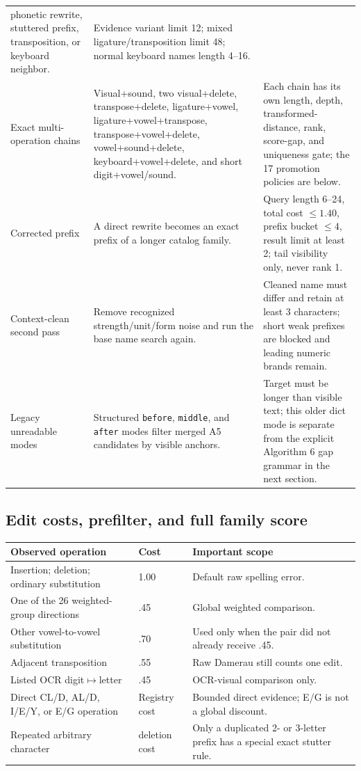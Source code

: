 \documentclass[10pt,a4paper]{article}
\begin{document}
\begin{longtable}{@{}L{34mm}L{68mm}L{64mm}@{}}
phonetic rewrite, stuttered prefix, transposition, or keyboard neighbor. &
Evidence variant limit 12; mixed ligature/transposition limit 48; normal
keyboard names length 4--16. \\
Exact multi-operation chains & Visual+sound, two visual+delete,
transpose+delete, ligature+vowel, ligature+vowel+transpose,
transpose+vowel+delete, vowel+sound+delete, keyboard+vowel+delete, and short
digit+vowel/sound. & Each chain has its own length, depth, transformed-distance,
rank, score-gap, and uniqueness gate; the 17 promotion policies are below. \\
Corrected prefix & A direct rewrite becomes an exact prefix of a longer
catalog family. & Query length 6--24, total cost $\leq1.40$, prefix bucket
$\leq4$, result limit at least 2; tail visibility only, never rank 1. \\
Context-clean second pass & Remove recognized strength/unit/form noise and run
the base name search again. & Cleaned name must differ and retain at least 3
characters; short weak prefixes are blocked and leading numeric brands remain. \\
Legacy unreadable modes & Structured \texttt{before}, \texttt{middle}, and
\texttt{after} modes filter merged A5 candidates by visible anchors. & Target
must be longer than visible text; this older dict mode is separate from the
explicit Algorithm 6 gap grammar in the next section. \\
\bottomrule
\end{longtable}

\subsection{Edit costs, prefilter, and full family score}

\begin{tabularx}{\textwidth}{@{}L{43mm}L{21mm}Y@{}}
\toprule
Observed operation & Cost & Important scope \\
\midrule
Insertion; deletion; ordinary substitution & 1.00 & Default raw spelling error. \\
One of the 26 weighted-group directions & .45 & Global weighted comparison. \\
Other vowel-to-vowel substitution & .70 & Used only when the pair did not already receive .45. \\
Adjacent transposition & .55 & Raw Damerau still counts one edit. \\
Listed OCR digit$\mapsto$letter & .45 & OCR-visual comparison only. \\
Direct CL/D, AL/D, I/E/Y, or E/G operation & Registry cost & Bounded direct evidence; E/G is not a global discount. \\
Repeated arbitrary character & deletion cost & Only a duplicated 2- or 3-letter prefix has a special exact stutter rule. \\
\bottomrule
\end{tabularx}
\end{document}
